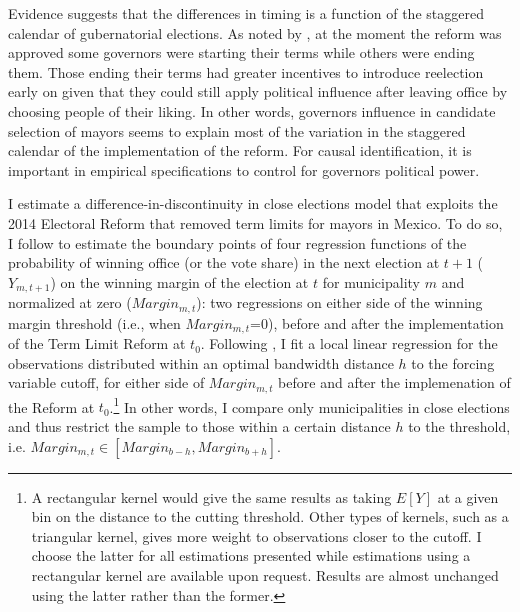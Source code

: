 \documentclass[12pt]{amsart}
\makeatletter
\def\subsection{\@startsection{subsection}{2}
	\z@{.8\linespacing\@plus.7\linespacing}{.7\linespacing}{\large}}
\numberwithin{equation}{section}
\theoremstyle{definition}
\theoremstyle{definition}
\theoremstyle{definition}
\makeatother
\begin{document}
Evidence suggests that the differences in timing is a function of the staggered calendar of gubernatorial elections. As noted by \citet{motolinia_2020}, at the moment the reform was approved some governors were starting their terms while others were ending them. Those ending their terms had greater incentives to introduce reelection early on given that they could still apply political influence after leaving office by choosing people of their liking. In other words, governors influence in candidate selection of mayors seems to explain most of the variation in the staggered calendar of the implementation of the reform. For causal identification, it is important in empirical specifications to control for governors political power. 

\subsection{Empirical Specification} 
  
I estimate  a difference-in-discontinuity in close elections model that exploits the 2014 Electoral Reform that removed term limits for mayors in Mexico. To do so, I follow \citet{grembi_etal_2017} to estimate the boundary points of four regression functions of the probability of winning office (or the vote share) in the next election at $t+1$ ($Y_{m,t+1}$) on the winning margin of the election at $t$ for municipality $m$ and normalized at zero ($Margin_{m,t}$): two regressions on either side of the winning margin threshold (i.e., when $Margin_{m,t}$=0), before and after the implementation of the Term Limit Reform at $t_0$. Following \citet{gelman_imbens2014}, I fit a local linear regression for the observations distributed within an  \citet{calonicoetal_2014} optimal bandwidth distance $h$ to the forcing variable cutoff, for either side of $Margin_{m,t}$ before and after the implemenation of the Reform at $t_0$.\footnote{A rectangular kernel would give the same results as taking $E[Y]$ at a given bin on the distance to the cutting threshold. Other types of kernels, such as a triangular kernel, gives more weight to observations closer to the cutoff. I choose the latter for all estimations presented while estimations using a rectangular kernel are available upon request. Results are almost unchanged using the latter rather than the former.} In other words, I compare only municipalities in close elections and thus restrict the sample to those within a certain distance $h$ to the threshold, i.e. $Margin_{m,t} \in [Margin_{b-h}, Margin_{b+h}]$.  
\end{document}
